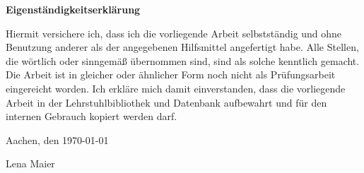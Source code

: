 \Large
\textsf{\textbf{Eigenständigkeitserklärung}}


\normalsize
\textsf{Hiermit versichere ich, dass ich die vorliegende Arbeit selbstständig und ohne Benutzung anderer als der angegebenen Hilfsmittel angefertigt habe. Alle Stellen, die wörtlich oder sinngemäß übernommen sind, sind als solche kenntlich gemacht. Die Arbeit ist in gleicher oder ähnlicher Form noch nicht als Prüfungsarbeit eingereicht worden. Ich erkläre mich damit einverstanden, dass die vorliegende Arbeit in der Lehrstuhlbibliothek und Datenbank aufbewahrt und für den internen Gebrauch kopiert werden darf.} \newline \newline


\textsf{Aachen, den \today \newline \newline}


\textsf{Lena Maier}
